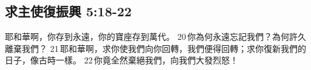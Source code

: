 \subsection{求主使復振興 5:18-22}
耶和華啊，你存到永遠，你的寶座存到萬代。 20 你為何永遠忘記我們？為何許久離棄我們？ 21 耶和華啊，求你使我們向你回轉，我們便得回轉；求你復新我們的日子，像古時一樣。 22 你竟全然棄絕我們，向我們大發烈怒！





















